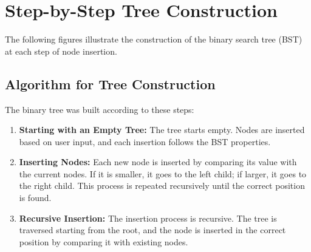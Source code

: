 \documentclass[10pt,a4paper]{article}
\begin{document}

\section*{Step-by-Step Tree Construction}
The following figures illustrate the construction of the binary search tree (BST) at each step of node insertion. 

\subsection*{Algorithm for Tree Construction}
The binary tree was built according to these steps:
\begin{enumerate}
    \item \textbf{Starting with an Empty Tree:} The tree starts empty. Nodes are inserted based on user input, and each insertion follows the BST properties.
    \item \textbf{Inserting Nodes:} Each new node is inserted by comparing its value with the current nodes. If it is smaller, it goes to the left child; if larger, it goes to the right child. This process is repeated recursively until the correct position is found.
    \item \textbf{Recursive Insertion:} The insertion process is recursive. The tree is traversed starting from the root, and the node is inserted in the correct position by comparing it with existing nodes.
\end{enumerate}

\end{document}
